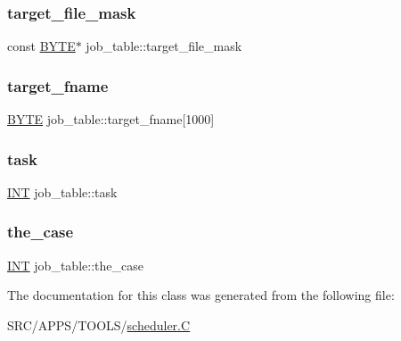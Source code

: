 \mbox{\label{classjob__table_a4f9543aaa023eb321acc2f9aa9c16e86}} 
\subsubsection{\texorpdfstring{target\+\_\+file\+\_\+mask}{target\_file\_mask}}
{\footnotesize\ttfamily const \mbox{\hyperlink{galois_8h_ab6cc7b4aeb6ea31aba2b3fbfc83ff5e6}{B\+Y\+TE}}$\ast$ job\+\_\+table\+::target\+\_\+file\+\_\+mask}

\mbox{\label{classjob__table_aafbc3b10b38b4a8a6879bb44a715755e}} 
\subsubsection{\texorpdfstring{target\+\_\+fname}{target\_fname}}
{\footnotesize\ttfamily \mbox{\hyperlink{galois_8h_ab6cc7b4aeb6ea31aba2b3fbfc83ff5e6}{B\+Y\+TE}} job\+\_\+table\+::target\+\_\+fname\mbox{[}1000\mbox{]}}

\mbox{\label{classjob__table_a5daa9a332184ba87fac5dde897c9c2cb}} 
\subsubsection{\texorpdfstring{task}{task}}
{\footnotesize\ttfamily \mbox{\hyperlink{galois_8h_a09fddde158a3a20bd2dcadb609de11dc}{I\+NT}} job\+\_\+table\+::task}

\mbox{\label{classjob__table_a873491706959209c24402d33a10012e9}} 
\subsubsection{\texorpdfstring{the\+\_\+case}{the\_case}}
{\footnotesize\ttfamily \mbox{\hyperlink{galois_8h_a09fddde158a3a20bd2dcadb609de11dc}{I\+NT}} job\+\_\+table\+::the\+\_\+case}



The documentation for this class was generated from the following file\+:\begin{DoxyCompactItemize}
\item 
S\+R\+C/\+A\+P\+P\+S/\+T\+O\+O\+L\+S/\mbox{\hyperlink{scheduler_8_c}{scheduler.\+C}}\end{DoxyCompactItemize}
